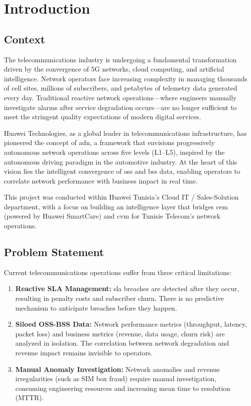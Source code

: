 \chapter{Introduction}
\label{ch:introduction}

\section{Context}

The telecommunications industry is undergoing a fundamental transformation driven by the convergence of 5G networks, cloud computing, and artificial intelligence. Network operators face increasing complexity in managing thousands of cell sites, millions of subscribers, and petabytes of telemetry data generated every day. Traditional reactive network operations---where engineers manually investigate alarms after service degradation occurs---are no longer sufficient to meet the stringent quality expectations of modern digital services.

Huawei Technologies, as a global leader in telecommunications infrastructure, has pioneered the concept of \gls{adn}, a framework that envisions progressively autonomous network operations across five levels (L1--L5), inspired by the autonomous driving paradigm in the automotive industry. At the heart of this vision lies the intelligent convergence of \gls{oss} and \gls{bss} data, enabling operators to correlate network performance with business impact in real time.

This project was conducted within Huawei Tunisia's Cloud IT / Sales-Solution department, with a focus on building an intelligence layer that bridges \gls{cem} (powered by Huawei SmartCare) and \gls{cvm} for Tunisie Telecom's network operations.

\section{Problem Statement}

Current telecommunications operations suffer from three critical limitations:

\begin{enumerate}
    \item \textbf{Reactive SLA Management:} \gls{sla} breaches are detected after they occur, resulting in penalty costs and subscriber churn. There is no predictive mechanism to anticipate breaches before they happen.

    \item \textbf{Siloed OSS-BSS Data:} Network performance metrics (throughput, latency, packet loss) and business metrics (revenue, data usage, churn risk) are analyzed in isolation. The correlation between network degradation and revenue impact remains invisible to operators.

    \item \textbf{Manual Anomaly Investigation:} Network anomalies and revenue irregularities (such as SIM box fraud) require manual investigation, consuming engineering resources and increasing mean time to resolution (MTTR).
\end{enumerate}

